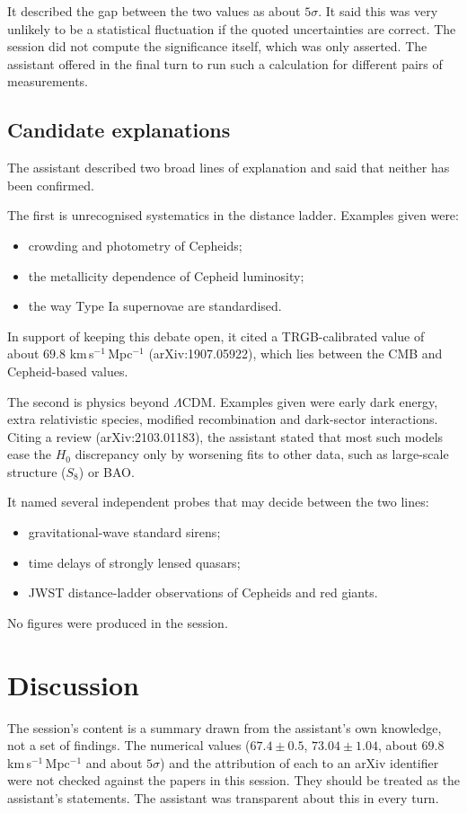 \documentclass[11pt,a4paper]{article}
\begin{document}
It described the gap between the two values as about $5\sigma$. It said this was very unlikely to be a statistical fluctuation if the quoted uncertainties are correct. The session did not compute the significance itself, which was only asserted. The assistant offered in the final turn to run such a calculation for different pairs of measurements.

\subsection{Candidate explanations}
The assistant described two broad lines of explanation and said that neither has been confirmed.

The first is unrecognised systematics in the distance ladder. Examples given were:
\begin{itemize}
\item crowding and photometry of Cepheids;
\item the metallicity dependence of Cepheid luminosity;
\item the way Type Ia supernovae are standardised.
\end{itemize}
In support of keeping this debate open, it cited a TRGB-calibrated value of about $69.8$ km\,s$^{-1}$\,Mpc$^{-1}$ (arXiv:1907.05922), which lies between the CMB and Cepheid-based values.

The second is physics beyond $\Lambda$CDM. Examples given were early dark energy, extra relativistic species, modified recombination and dark-sector interactions. Citing a review (arXiv:2103.01183), the assistant stated that most such models ease the $H_0$ discrepancy only by worsening fits to other data, such as large-scale structure ($S_8$) or BAO.

It named several independent probes that may decide between the two lines:
\begin{itemize}
\item gravitational-wave standard sirens;
\item time delays of strongly lensed quasars;
\item JWST distance-ladder observations of Cepheids and red giants.
\end{itemize}

No figures were produced in the session.

\section{Discussion}
The session's content is a summary drawn from the assistant's own knowledge, not a set of findings. The numerical values ($67.4 \pm 0.5$, $73.04 \pm 1.04$, about $69.8$ km\,s$^{-1}$\,Mpc$^{-1}$ and about $5\sigma$) and the attribution of each to an arXiv identifier were not checked against the papers in this session. They should be treated as the assistant's statements. The assistant was transparent about this in every turn.
\end{document}
